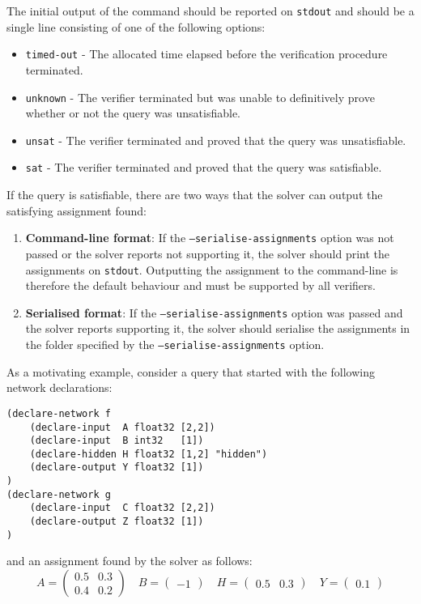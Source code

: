 \noindent The initial output of the command should be reported on \texttt{stdout} and should be a single line consisting of one of the following options: 
\begin{itemize}
\item \texttt{timed-out} - The allocated time elapsed before the verification procedure terminated.
\item \texttt{unknown} - The verifier terminated but was unable to definitively prove whether or not the query was unsatisfiable.
\item \texttt{unsat} - The verifier terminated and proved that the query was unsatisfiable.
\item \texttt{sat} - The verifier terminated and proved that the query was satisfiable.
\end{itemize}
If the query is satisfiable, there are two ways that the solver can output the satisfying assignment found:
\begin{enumerate}
\item \textbf{Command-line format}: If the \texttt{--serialise-assignments} option was not passed or the solver reports not supporting it, the solver should print the assignments on \texttt{stdout}. Outputting the assignment to the command-line is therefore the default behaviour and must be supported by all verifiers.
\item \textbf{Serialised format}: If the \texttt{--serialise-assignments} option was passed and the solver reports supporting it, the solver should serialise the assignments in the folder specified by the \texttt{--serialise-assignments} option.
\end{enumerate}
As a motivating example, consider a \vnnlib{} query that started with the following network declarations:
\begin{lstlisting}[style=bash]
(declare-network f
    (declare-input  A float32 [2,2])
    (declare-input  B int32   [1])
    (declare-hidden H float32 [1,2] "hidden")
    (declare-output Y float32 [1])
)
(declare-network g
    (declare-input  C float32 [2,2])
    (declare-output Z float32 [1])
)
\end{lstlisting}
and an assignment found by the solver as follows:
\begin{equation*}
A = \begin{pmatrix}
0.5 & 0.3 \\
0.4 & 0.2
\end{pmatrix}
\quad
B = \begin{pmatrix}
-1
\end{pmatrix}
\quad
H = \begin{pmatrix}
0.5 & 0.3
\end{pmatrix}
\quad
Y = \begin{pmatrix}
0.1
\end{pmatrix}
\end{equation*}
